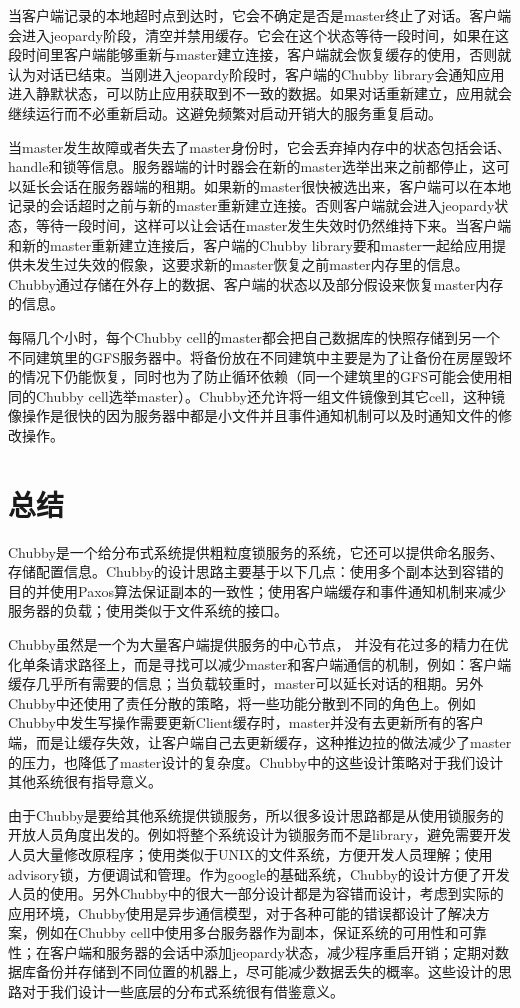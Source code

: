 \documentclass[UTF8]{article}
\begin{document}
	当客户端记录的本地超时点到达时，它会不确定是否是master终止了对话。客户端会进入jeopardy阶段，清空并禁用缓存。它会在这个状态等待一段时间，如果在这段时间里客户端能够重新与master建立连接，客户端就会恢复缓存的使用，否则就认为对话已结束。当刚进入jeopardy阶段时，客户端的Chubby library会通知应用进入静默状态，可以防止应用获取到不一致的数据。如果对话重新建立，应用就会继续运行而不必重新启动。这避免频繁对启动开销大的服务重复启动。

	当master发生故障或者失去了master身份时，它会丢弃掉内存中的状态包括会话、handle和锁等信息。服务器端的计时器会在新的master选举出来之前都停止，这可以延长会话在服务器端的租期。如果新的master很快被选出来，客户端可以在本地记录的会话超时之前与新的master重新建立连接。否则客户端就会进入jeopardy状态，等待一段时间，这样可以让会话在master发生失效时仍然维持下来。当客户端和新的master重新建立连接后，客户端的Chubby library要和master一起给应用提供未发生过失效的假象，这要求新的master恢复之前master内存里的信息。Chubby通过存储在外存上的数据、客户端的状态以及部分假设来恢复master内存的信息。
	
	每隔几个小时，每个Chubby cell的master都会把自己数据库的快照存储到另一个不同建筑里的GFS服务器中。将备份放在不同建筑中主要是为了让备份在房屋毁坏的情况下仍能恢复，同时也为了防止循环依赖（同一个建筑里的GFS可能会使用相同的Chubby cell选举master）。Chubby还允许将一组文件镜像到其它cell，这种镜像操作是很快的因为服务器中都是小文件并且事件通知机制可以及时通知文件的修改操作。
	
\section{总结}
	
	Chubby是一个给分布式系统提供粗粒度锁服务的系统，它还可以提供命名服务、存储配置信息。Chubby的设计思路主要基于以下几点：使用多个副本达到容错的目的并使用Paxos算法保证副本的一致性；使用客户端缓存和事件通知机制来减少服务器的负载；使用类似于文件系统的接口。
	
	Chubby虽然是一个为大量客户端提供服务的中心节点， 并没有花过多的精力在优化单条请求路径上，而是寻找可以减少master和客户端通信的机制，例如：客户端缓存几乎所有需要的信息；当负载较重时，master可以延长对话的租期。另外Chubby中还使用了责任分散的策略，将一些功能分散到不同的角色上。例如Chubby中发生写操作需要更新Client缓存时，master并没有去更新所有的客户端，而是让缓存失效，让客户端自己去更新缓存，这种推边拉的做法减少了master的压力，也降低了master设计的复杂度。Chubby中的这些设计策略对于我们设计其他系统很有指导意义。

	由于Chubby是要给其他系统提供锁服务，所以很多设计思路都是从使用锁服务的开放人员角度出发的。例如将整个系统设计为锁服务而不是library，避免需要开发人员大量修改原程序；使用类似于UNIX的文件系统，方便开发人员理解；使用advisory锁，方便调试和管理。作为google的基础系统，Chubby的设计方便了开发人员的使用。另外Chubby中的很大一部分设计都是为容错而设计，考虑到实际的应用环境，Chubby使用是异步通信模型，对于各种可能的错误都设计了解决方案，例如在Chubby cell中使用多台服务器作为副本，保证系统的可用性和可靠性；在客户端和服务器的会话中添加jeopardy状态，减少程序重启开销；定期对数据库备份并存储到不同位置的机器上，尽可能减少数据丢失的概率。这些设计的思路对于我们设计一些底层的分布式系统很有借鉴意义。



	


	
\end{document}
